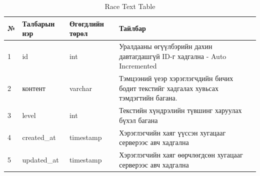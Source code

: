 \begin{table}[h]
	\caption{Race Text Table}
	\begin{tabular}{|l|l|l|p{8cm}|}
		\hline
		№ & Талбарын нэр & Өгөгдлийн төрөл & Тайлбар                                                                               \\ \hline
		1 & id           & int             & Уралдааны өгүүлбэрийн дахин давтагдашгүй ID-г хадгална - Auto Incremented             \\ \hline
		2 & контент      & varchar         & Тэмцээний үеэр хэрэглэгчдийн бичих бодит текстийг хадгалах хувьсах тэмдэгтийн багана. \\ \hline
		3 & level        & int             & Текстийн хүндрэлийн түвшинг харуулах бүхэл багана                                     \\ \hline
		4 & created\_at  & timestamp       & Хэрэглэгчийн хаяг үүссэн хугацааг серверээс авч хадгална                              \\ \hline
		5 & updated\_at  & timestamp       & Хэрэглэгчийн хаяг өөрчлөгдсөн хугацааг серверээс авч хадгална                         \\ \hline
	\end{tabular}
\end{table}



\clearpage





